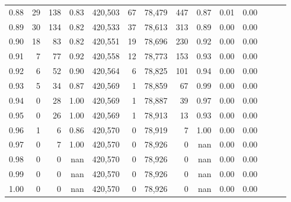\begin{tabular}{rrrrrrrrrrrrrr}
0.88 &      29 &    138 &  0.83 &  420,503 &       67 &  78,479 &     447 &  0.87 &  0.01 &      0.00 \\
0.89 &      30 &    134 &  0.82 &  420,533 &       37 &  78,613 &     313 &  0.89 &  0.00 &      0.00 \\
0.90 &      18 &     83 &  0.82 &  420,551 &       19 &  78,696 &     230 &  0.92 &  0.00 &      0.00 \\
0.91 &       7 &     77 &  0.92 &  420,558 &       12 &  78,773 &     153 &  0.93 &  0.00 &      0.00 \\
0.92 &       6 &     52 &  0.90 &  420,564 &        6 &  78,825 &     101 &  0.94 &  0.00 &      0.00 \\
0.93 &       5 &     34 &  0.87 &  420,569 &        1 &  78,859 &      67 &  0.99 &  0.00 &      0.00 \\
0.94 &       0 &     28 &  1.00 &  420,569 &        1 &  78,887 &      39 &  0.97 &  0.00 &      0.00 \\
0.95 &       0 &     26 &  1.00 &  420,569 &        1 &  78,913 &      13 &  0.93 &  0.00 &      0.00 \\
0.96 &       1 &      6 &  0.86 &  420,570 &        0 &  78,919 &       7 &  1.00 &  0.00 &      0.00 \\
0.97 &       0 &      7 &  1.00 &  420,570 &        0 &  78,926 &       0 &   nan &  0.00 &      0.00 \\
0.98 &       0 &      0 &   nan &  420,570 &        0 &  78,926 &       0 &   nan &  0.00 &      0.00 \\
0.99 &       0 &      0 &   nan &  420,570 &        0 &  78,926 &       0 &   nan &  0.00 &      0.00 \\
1.00 &       0 &      0 &   nan &  420,570 &        0 &  78,926 &       0 &   nan &  0.00 &      0.00 \\
\bottomrule
\end{tabular}
